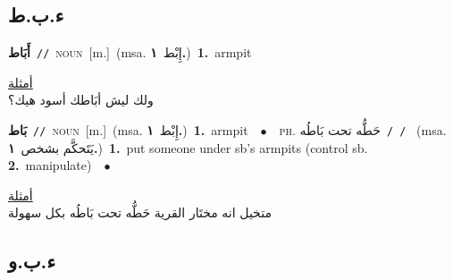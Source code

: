 \documentclass[10pt,a4paper,twoside]{article} %
\begin{document}
\begin{multicols}{2}
\vspace{-7mm}
\subsection*{\foreignlanguage{arabic}{ء.ب.ط}} 

{\setlength\topsep{0pt}\textbf{\foreignlanguage{arabic}{أَبَاط}}\ {\color{gray}\texttt{//}\color{black}}\ \textsc{noun}\ [m.]\ \color{gray}(msa. \foreignlanguage{arabic}{إِبْط}~\foreignlanguage{arabic}{\textbf{١.}}\color{black})\ \textbf{1.}~armpit\  \begin{flushright}\color{lightgray}\underline{\foreignlanguage{arabic}{أمثلة}}\\\noindent \foreignlanguage{arabic}{ولك ليش أبَاطك أسود هيك؟}\end{flushright}\color{black}} \vspace{2mm}

{\setlength\topsep{0pt}\textbf{\foreignlanguage{arabic}{بَاط}}\ {\color{gray}\texttt{//}\color{black}}\ \textsc{noun}\ [m.]\ \color{gray}(msa. \foreignlanguage{arabic}{إِبْط}~\foreignlanguage{arabic}{\textbf{١.}}\color{black})\ \textbf{1.}~armpit\ \ $\bullet$\ \ \textsc{ph.} \color{gray} \foreignlanguage{arabic}{حَطُّه تحت بَاطُه}\color{black}\ {\color{gray}\texttt{/  /}\color{black}}\ \color{gray} (msa. \foreignlanguage{arabic}{يَتَحكَّم بشخص}~\foreignlanguage{arabic}{\textbf{١.}})\color{black}\ \textbf{1.}~put someone under sb's armpits (control sb.  \textbf{2.}~manipulate)\ \ $\bullet$\ \  \begin{flushright}\color{lightgray}\underline{\foreignlanguage{arabic}{أمثلة}}\\\noindent \foreignlanguage{arabic}{متخيل انه مختَار القرية حَطُّه تحت بَاطُه بكل سهولة}\end{flushright}\color{black}} \vspace{2mm}

\vspace{-7mm}
\subsection*{\foreignlanguage{arabic}{ء.ب.و}} 


\end{multicols}
\end{document}
